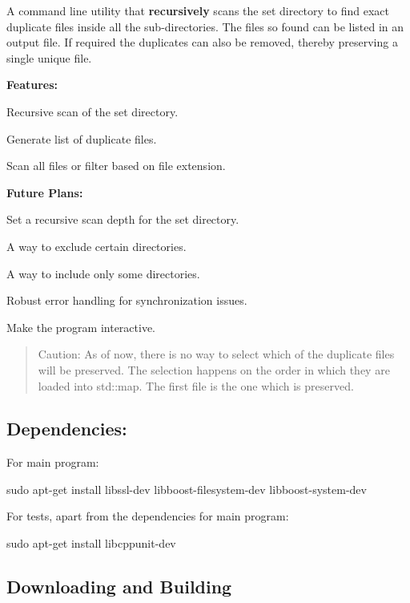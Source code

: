 A command line utility that {\bfseries recursively} scans the set directory to find exact duplicate files inside all the sub-\/directories. The files so found can be listed in an output file. If required the duplicates can also be removed, thereby preserving a single unique file.

{\bfseries Features\+:}
\begin{DoxyEnumerate}
\item Recursive scan of the set directory.
\item Generate list of duplicate files.
\item Scan all files or filter based on file extension.
\end{DoxyEnumerate}

{\bfseries Future Plans\+:}
\begin{DoxyEnumerate}
\item Set a recursive scan depth for the set directory.
\item A way to exclude certain directories.
\item A way to include only some directories.
\item Robust error handling for synchronization issues.
\item Make the program interactive.
\end{DoxyEnumerate}

\begin{quote}
Caution\+: As of now, there is no way to select which of the duplicate files will be preserved. The selection happens on the order in which they are loaded into {\ttfamily std\+::map}. The first file is the one which is preserved. \end{quote}


\subsection*{\label{_dep}%
Dependencies\+:}


\begin{DoxyEnumerate}
\item For main program\+:

{\ttfamily sudo apt-\/get install libssl-\/dev libboost-\/filesystem-\/dev libboost-\/system-\/dev}
\item For tests, apart from the dependencies for main program\+:

{\ttfamily sudo apt-\/get install libcppunit-\/dev}
\end{DoxyEnumerate}

\subsection*{Downloading and Building}


